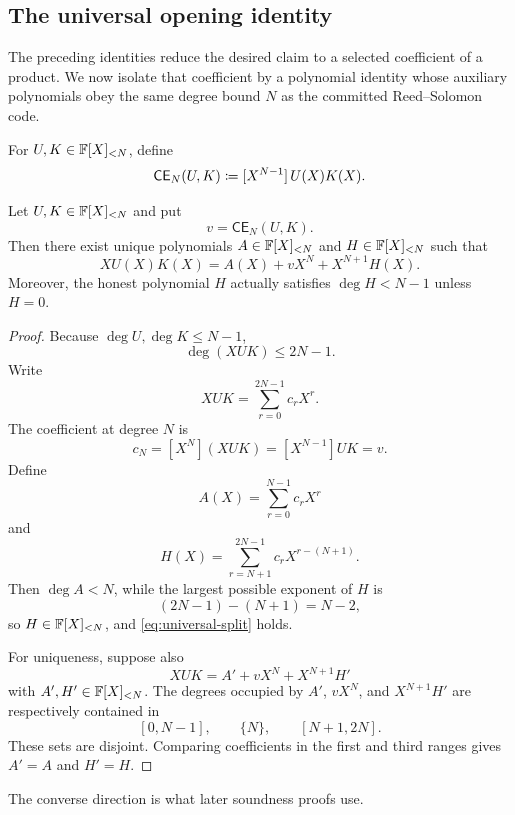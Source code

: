 \subsection{The universal opening identity}
\label{sec:universal-opening-identity}

The preceding identities reduce the desired claim to a selected coefficient of a product.  We now isolate that coefficient by a polynomial identity whose auxiliary polynomials obey the same degree bound $N$ as the committed Reed--Solomon code.

\begin{definition}
\label{def:coefficient-functional}
For $U,K\in\mathbb{F}[X]_{<N}$, define
\begin{equation}
  \mathsf{CE}_N(U,K)
  \coloneqq
  [X^{N-1}]\,U(X)K(X).
  \label{eq:coefficient-functional}
\end{equation}
\end{definition}

\begin{theorem}
\label{thm:universal-split}
Let $U,K\in\mathbb{F}[X]_{<N}$ and put
\[
  v=\mathsf{CE}_N(U,K).
\]
Then there exist unique polynomials $A\in\mathbb{F}[X]_{<N}$ and $H\in\mathbb{F}[X]_{<N}$ such that
\begin{equation}
  XU(X)K(X)
  =A(X)+vX^N+X^{N+1}H(X).
  \label{eq:universal-split}
\end{equation}
Moreover, the honest polynomial $H$ actually satisfies $\deg H<N-1$ unless $H=0$.
\end{theorem}

\begin{proof}
Because $\deg U,\deg K\le N-1$,
\[
  \deg(XUK)\le2N-1.
\]
Write
\[
  XUK=\sum_{r=0}^{2N-1}c_rX^r.
\]
The coefficient at degree $N$ is
\[
  c_N=[X^N](XUK)=[X^{N-1}]UK=v.
\]
Define
\[
  A(X)=\sum_{r=0}^{N-1}c_rX^r
\]
and
\[
  H(X)=\sum_{r=N+1}^{2N-1}c_rX^{r-(N+1)}.
\]
Then $\deg A<N$, while the largest possible exponent of $H$ is
\[
  (2N-1)-(N+1)=N-2,
\]
so $H\in\mathbb{F}[X]_{<N}$, and \eqref{eq:universal-split} holds.

For uniqueness, suppose also
\[
  XUK=A'+vX^N+X^{N+1}H'
\]
with $A',H'\in\mathbb{F}[X]_{<N}$.  The degrees occupied by $A'$, $vX^N$, and $X^{N+1}H'$ are respectively contained in
\[
  [0,N-1],\qquad \{N\},\qquad [N+1,2N].
\]
These sets are disjoint.  Comparing coefficients in the first and third ranges gives $A'=A$ and $H'=H$.
\end{proof}

The converse direction is what later soundness proofs use.

